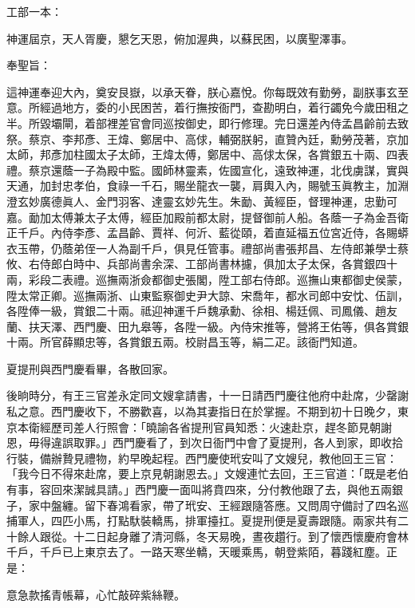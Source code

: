 \begin{myquote}[\markfont]
工部一本：

神運屆京，天人胥慶，懇乞天恩，俯加渥典，以蘇民困，以廣聖澤事。

奉聖旨：

這神運奉迎大內，奠安艮嶽，以承天眷，朕心嘉悅。你每既效有勤勞，副朕事玄至意。所經過地方，委的小民困苦，着行撫按衙門，查勘明白，着行蠲免今歲田租之半。所毀壩閘，着部裡差官會同巡按御史，即行修理。完日還差內侍孟昌齡前去致祭。蔡京、李邦彥、王煒、鄭居中、高俅，輔弼朕躬，直贊內廷，勳勞茂著，京加太師，邦彥加柱國太子太師，王煒太傅，鄭居中、高俅太保，各賞銀五十兩、四表禮。蔡京還蔭一子為殿中監。國師林靈素，佐國宣化，遠致神運，北伐虜謀，實與天通，加封忠孝伯，食祿一千石，賜坐龍衣一襲，肩輿入內，賜號玉眞教主，加淵澄玄妙廣德眞人、金門羽客、達靈玄妙先生。{}朱勔、黃經臣，督理神運，忠勤可嘉。勔加太傅兼太子太傅，經臣加殿前都太尉，提督御前人船。各蔭一子為金吾衛正千戶。內侍李彥、孟昌齡、賈祥、何沂、藍從頤，着直延福五位宮近侍，各賜蟒衣玉帶，仍蔭弟侄一人為副千戶，俱見任管事。禮部尚書張邦昌、左侍郎兼學士蔡攸、右侍郎白時中、兵部尚書余深、工部尚書林攄，俱加太子太保，各賞銀四十兩，彩段二表禮。巡撫兩浙僉都御史張閣，陞工部右侍郎。巡撫山東都御史侯蒙，陞太常正卿。巡撫兩浙、山東監察御史尹大諒、宋喬年，都水司郎中安忱、伍訓，各陞俸一級，賞銀二十兩。祗迎神運千戶魏承勳、徐相、楊廷佩、司鳳儀、趙友蘭、扶天澤、西門慶、田九皋等，各陞一級。內侍宋推等，營將王佑等，俱各賞銀十兩。所官薛顯忠等，各賞銀五兩。校尉昌玉等，絹二疋。該衙門知道。
\end{myquote} 

夏提刑與西門慶看畢，各散回家。

後晌時分，有王三官差永定同文嫂拿請書，十一日請西門慶往他府中赴席，少罄謝私之意。西門慶收下，不勝歡喜，以為其妻指日在於掌握。{}不期到初十日晚夕，東京本衛經歷司差人行照會：「曉諭各省提刑官員知悉：火速赴京，趕冬節見朝謝恩，毋得違誤取罪。」西門慶看了，到次日衙門中會了夏提刑，各人到家，即收拾行裝，備辦贄見禮物，約早晚起程。西門慶使玳安叫了文嫂兒，教他回王三官：「我今日不得來赴席，要上京見朝謝恩去。」文嫂連忙去回，王三官道：「既是老伯有事，容回來潔誠具請。」西門慶一面叫將賁四來，分付教他跟了去，與他五兩銀子，家中盤纏。留下春鴻看家，帶了玳安、王經跟隨答應。又問周守備討了四名巡捕軍人，四匹小馬，打點馱裝轎馬，排軍擡扛。夏提刑便是夏壽跟隨。兩家共有二十餘人跟從。十二日起身離了清河縣，冬天易晚，晝夜趲行。到了懷西懷慶府會林千戶，千戶已上東京去了。一路天寒坐轎，天暖乘馬，朝登紫陌，暮踐紅塵。正是：

\begin{myquote}
意急款搖青帳幕，心忙敲碎紫絲鞭。
\end{myquote}

